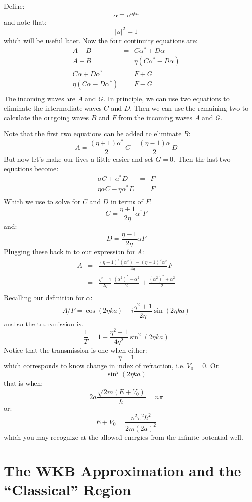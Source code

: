 \documentclass[12pt]{book}
\begin{document}
Define:
$$\alpha \equiv e^{i\eta ka}$$
and note that:
$$|\alpha|^2 = 1$$
which will be useful later.  Now the four continuity equations are:
\begin{eqnarray*}
A + B &=& C \alpha^* + D \alpha \\
A - B &=& \eta(C \alpha^* - D \alpha) \\
C \alpha + D \alpha^* &=& F + G  \\
\eta(C \alpha - D \alpha^*) &=& F - G \\
\end{eqnarray*}
The incoming waves are $A$ and $G$.  In principle, we can use two equations to eliminate the intermediate waves $C$ and $D$.  Then we can use the remaining two to calculate the outgoing waves $B$ and $F$ from the incoming waves $A$ and $G$. 

Note that the first two equations can be added to eliminate $B$:
$$A = \frac{(\eta+1) \alpha^*}{2} \, C - \frac{(\eta-1) \alpha}{2} \, D$$
But now let's make our lives a little easier and set $G=0$.  Then the last two equations become:
\begin{eqnarray*}
\alpha C  + \alpha^* D &=& F   \\
\eta \alpha C  - \eta \alpha^* D &=& F  \\
\end{eqnarray*}
Which we use to solve for $C$ and $D$ in terms of $F$:
$$C = \frac{\eta+1}{2\eta}\alpha^* F$$
and:
$$D = \frac{\eta-1}{2\eta}\alpha F$$
Plugging these back in to our expression for $A$:
\begin{eqnarray*}
A &=& \frac{(\eta+1)^2 (\alpha^2)^* - (\eta-1)^2 \alpha^2}{4 \eta} \, F \\
  &=& \frac{\eta^2+1}{2\eta}\,\frac{(\alpha^2)^*-\alpha^2}{2}+\frac{(\alpha^2)^*+\alpha^2}{2}\\
\end{eqnarray*}
Recalling our definition for $\alpha$:
$$A/F = \cos(2\eta ka) - i\frac{\eta^2+1}{2\eta} \sin(2\eta ka)$$
and so the transmission is:
$$\frac{1}{T} = 1 + \frac{\eta^2-1}{4\eta^2}\sin^2(2\eta ka) $$
Notice that the transmission is one when either:
$$\eta=1$$
which corresponds to know change in index of refraction, i.e. $V_0=0$.  Or:
$$\sin^2(2\eta ka) $$
that is when:
$$ 2a\frac{\sqrt{2m(E+V_0)}}{\hbar}= n \pi$$
or:
$$E+V_0 = \frac{n^2 \pi^2 \hbar^2}{2m (2a)^2}$$
which you may recognize at the allowed energies from the infinite potential well.


\section{The WKB Approximation and the ``Classical'' Region}
\end{document}
